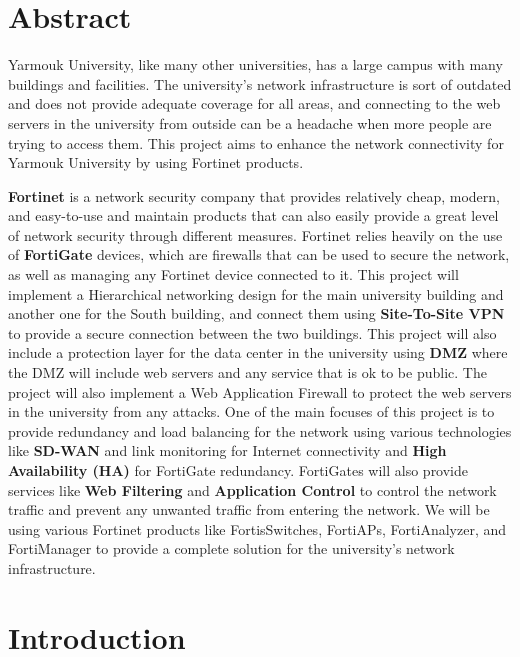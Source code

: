 \documentclass[12pt]{report}
\begin{document}
\newpage
\tableofcontents
\newpage
\listoftables
\newpage
\listoffigures


\newpage
\chapter*{Abstract}
Yarmouk University, like many other universities, 
has a large campus with many buildings and facilities. 
The university's network infrastructure is sort of outdated and does not provide 
adequate coverage for all areas, and connecting to the web servers in the university from outside can 
be a headache when more people are trying to access them.
This project aims to enhance the network connectivity for Yarmouk University 
by using Fortinet products. 

\textbf{Fortinet} is a network security company that provides relatively cheap, modern, and easy-to-use and maintain products that can also easily provide a great level of network security through different measures.
Fortinet relies heavily on the use of \textbf{FortiGate} devices, which are firewalls that can be used to secure the network, as well as managing any Fortinet device connected to it.
This project will implement a Hierarchical networking design for the main university building and another one for the South building, and connect them using \textbf{Site-To-Site VPN} to provide a secure connection between the two buildings.
This project will also include a protection layer for the data center in the university using \textbf{DMZ} where the DMZ will include web servers and any service that is ok to be public.
The project will also implement a Web Application Firewall to protect the web servers in the university from any attacks.
One of the main focuses of this project is to provide redundancy and load balancing for the network using 
various technologies like \textbf{SD-WAN} and link monitoring for Internet connectivity and \textbf{High Availability (HA)} for FortiGate redundancy.
FortiGates will also provide services like \textbf{Web Filtering} and \textbf{Application Control} to control the network traffic and prevent any unwanted traffic from entering the network.
We will be using various Fortinet products like FortisSwitches, FortiAPs, FortiAnalyzer, and FortiManager to provide a complete solution for the university's network infrastructure.

\clearpage
{}
\chapter{Introduction}
\end{document}
